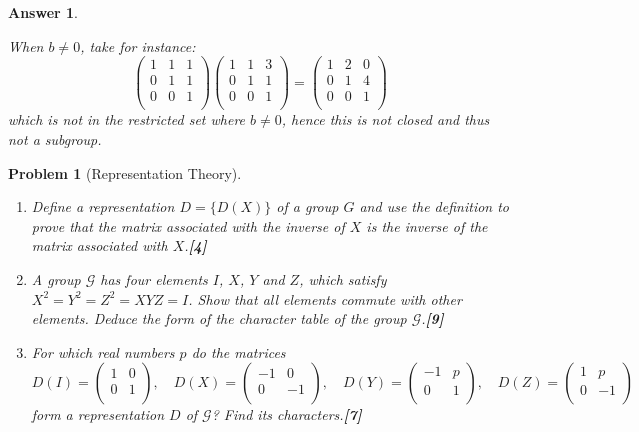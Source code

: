 \documentclass[a4paper]{article}
\newtheorem{ans}{Answer}[section]
\theoremstyle{new}
\newtheorem{qns}{Problem}[section]
\begin{document}
\begin{ans}
\begin{enumerate}[label=(\alph*)]
When $b\neq 0$, take for instance:
$$\begin{pmatrix}1&1&1\\0&1&1\\0&0&1\\\end{pmatrix}\begin{pmatrix}1&1&3\\0&1&1\\0&0&1\\\end{pmatrix}=\begin{pmatrix}1&2&0\\0&1&4\\0&0&1\\\end{pmatrix}$$
which is not in the restricted set where $b\neq 0$, hence this is not closed and thus not a subgroup.
\end{enumerate}
\end{ans}
\newpage
\begin{qns}[Representation Theory]\leavevmode
\begin{enumerate}[label=(\alph*)]
\item Define a representation $D = \{D(X)\}$ of a group $G$ and use the definition to prove that the matrix associated with the inverse of $X$ is the inverse of the matrix associated with $X$.\hfill\textbf{[4]}
\item A group $\mathcal{G}$ has four elements $I$, $X$, $Y$ and $Z$, which satisfy $X^2=Y^2=Z^2=XYZ=I$. Show that all elements commute with other elements. Deduce the form of the character table of the group $\mathcal{G}$.\hfill\textbf{[9]}\item For which real numbers $p$ do the matrices
$$D(I)=\begin{pmatrix}1&0\\0&1\\\end{pmatrix},\quad D(X)=\begin{pmatrix}-1&0\\0&-1\\\end{pmatrix},\quad D(Y)=\begin{pmatrix}-1&p\\0&1\\\end{pmatrix},\quad D(Z)=\begin{pmatrix}1&p\\0&-1\\\end{pmatrix}$$
form a representation $D$ of $\mathcal{G}$? Find its characters.\hfill\textbf{[7]}
\end{enumerate}
\end{qns}
\end{document}
